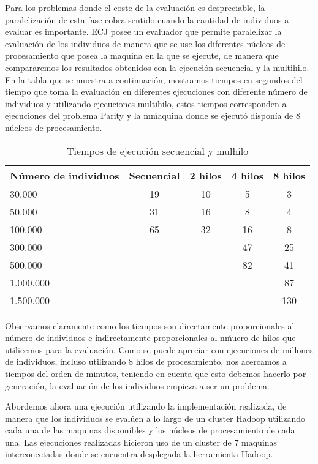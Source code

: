 \label{resultados-parity}

Para los problemas donde el coste de la evaluación es despreciable, la paralelizaci\'on de esta fase cobra sentido cuando la cantidad de individuos a evaluar es importante. ECJ posee un evaluador que permite paralelizar la evaluación de los individuos de manera que se use los diferentes núcleos de procesamiento que posea la maquina en la que se ejecute, de manera que compararemos los resultados obtenidos con la ejecución secuencial y la multihilo. En la tabla que se muestra a continuación, mostramos tiempos en segundos del tiempo que toma la evaluación en diferentes ejecuciones con diferente n\'umero de individuos y utilizando ejecuciones multihilo, estos tiempos corresponden a ejecuciones del problema Parity y la m\'maquina donde se ejecut\'o disponía de 8 núcleos de procesamiento.

\begin{table}[H]
  \begin{center}
    \begin{center}
    \begin{tabular}{l | c c c c}
    N\'umero de individuos & Secuencial & 2 hilos & 4 hilos & 8 hilos \\ \hline
    30.000 & 19 & 10 & 5 & 3\\
    50.000 & 31 & 16 & 8 & 4\\
    100.000 & 65 & 32 & 16 & 8\\
    300.000 & & & 47 & 25\\
    500.000 & & & 82 & 41\\
    1.000.000 & & & & 87\\
    1.500.000 & & & & 130\\
    \end{tabular}
    \end{center}
    \caption{Tiempos de ejecución secuencial y mulhilo}
    \label{tabla_tiempos_ecj}
  \end{center}
\end{table}

Observamos claramente como los tiempos son directamente proporcionales al n\'umero de individuos e indirectamente proporcionales al n\'muero de hilos que utilicemos para la evaluación. Como se puede apreciar con ejecuciones de millones de individuos, incluso utilizando 8 hilos de procesamiento, nos acercamos a tiempos del orden de minutos, teniendo en cuenta que esto debemos hacerlo por generación, la evaluación de los individuos empieza a ser un problema. 

Abordemos ahora una ejecución utilizando la implementación realizada, de manera que los individuos se evalúen a lo largo de un cluster Hadoop utilizando cada una de las maquinas disponibles y los núcleos de procesamiento de cada una. Las ejecuciones realizadas hicieron uso de un cluster de 7 maquinas interconectadas donde se encuentra desplegada la herramienta Hadoop.